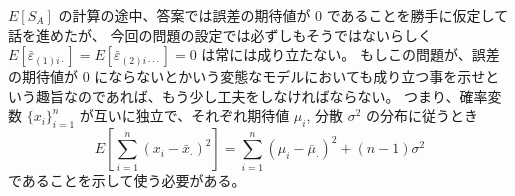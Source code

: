 \documentclass[./main.tex]{subfiles}
\begin{document}
\begin{enumerate}
        $E[S_A]$ の計算の途中、答案では誤差の期待値が $0$ であることを勝手に仮定して話を進めたが、
        今回の問題の設定では必ずしもそうではないらしく $E[ \bar{\varepsilon}_{(1)i\cdot} ] = E [ \bar{\varepsilon}_{(2)i\cdot\cdot\cdot}] = 0$ は常には成り立たない。
        もしこの問題が、誤差の期待値が $0$ にならないとかいう変態なモデルにおいても成り立つ事を示せという趣旨なのであれば、もう少し工夫をしなければならない。
        つまり、確率変数 $\{ x_i \}_{i=1}^{n}$ が互いに独立で、それぞれ期待値 $\mu_i$, 分散 $\sigma^2$ の分布に従うとき
        \begin{equation*}
            E \left[  
                \sum_{i=1}^n (x_i - \bar{x}_\cdot)^2
            \right]
            = \sum_{i=1}^n (\mu_i - \bar{\mu}_\cdot)^2 + (n - 1) \sigma^2
        \end{equation*}
        であることを示して使う必要がある。


\end{enumerate}
\end{document}
